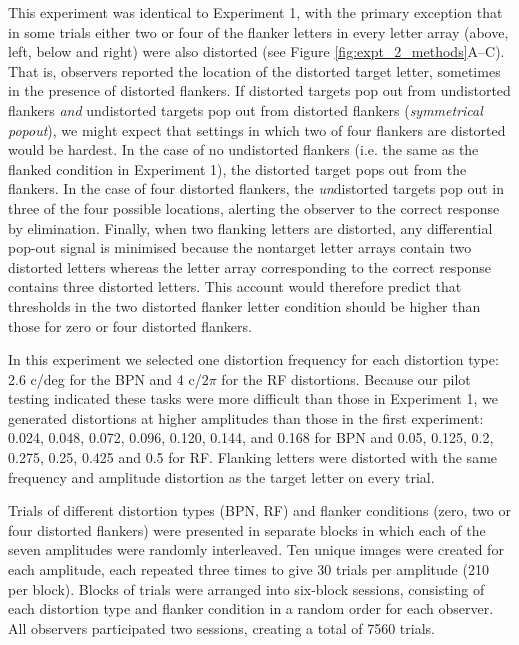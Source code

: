 \documentclass[doc, 11pt,a4paper,natbib]{apa6}\usepackage[]{graphicx}\usepackage[]{color}
\begin{document}
This experiment was identical to Experiment 1, with the primary exception that in some trials either two or four of the flanker letters in every letter array (above, left, below and right) were also distorted (see Figure \ref{fig:expt_2_methods}A--C).
That is, observers reported the location of the distorted target letter, sometimes in the presence of distorted flankers.
If distorted targets pop out from undistorted flankers \textit{and} undistorted targets pop out from distorted flankers (\textit{symmetrical popout}), we might expect that settings in which two of four flankers are distorted would be hardest.
In the case of no undistorted flankers (i.e. the same as the flanked condition in Experiment 1), the distorted target pops out from the flankers.
In the case of four distorted flankers, the \textit{un}distorted targets pop out in three of the four possible locations, alerting the observer to the correct response by elimination.
Finally, when two flanking letters are distorted, any differential pop-out signal is minimised because the nontarget letter arrays contain two distorted letters whereas the letter array corresponding to the correct response contains three distorted letters.
This account would therefore predict that thresholds in the two distorted flanker letter condition should be higher than those for zero or four distorted flankers.

In this experiment we selected one distortion frequency for each distortion type: 2.6 c/deg for the BPN and 4 c/$2\pi$ for the RF distortions.
Because our pilot testing indicated these tasks were more difficult than those in Experiment 1, we generated distortions at higher amplitudes than those in the first experiment: 0.024, 0.048, 0.072, 0.096, 0.120, 0.144, and 0.168 for BPN and 0.05, 0.125, 0.2, 0.275, 0.25, 0.425 and 0.5 for RF.
Flanking letters were distorted with the same frequency and amplitude distortion as the target letter on every trial.

Trials of different distortion types (BPN, RF) and flanker conditions (zero, two or four distorted flankers) were presented in separate blocks in which each of the seven amplitudes were randomly interleaved.
Ten unique images were created for each amplitude, each repeated three times to give 30 trials per amplitude (210 per block).
Blocks of trials were arranged into six-block sessions, consisting of each distortion type and flanker condition in a random order for each observer.
All observers participated two sessions, creating a total of 7560 trials.
\end{document}
